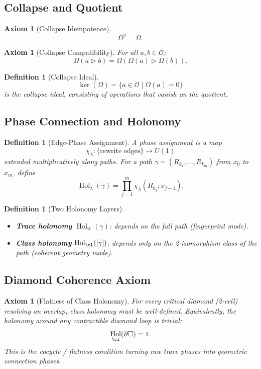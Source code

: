 \documentclass[12pt, oneside]{article}
\newtheorem{definition}[theorem]{Definition}
\newtheorem{axiom}[theorem]{Axiom}
\DeclareMathOperator{\tr}{tr}
\DeclareMathOperator{\Hol}{Hol}
\begin{document}
\subsection{Collapse and Quotient}

\begin{axiom}[Collapse Idempotence]
\[
\Omega^2 = \Omega.
\]
\end{axiom}

\begin{axiom}[Collapse Compatibility]
For all $a,b \in \mathcal{O}$:
\[
\Omega(a \triangleright b) = \Omega(\Omega(a) \triangleright \Omega(b)).
\]
\end{axiom}

\begin{definition}[Collapse Ideal]
\[
\ker(\Omega) = \{ a \in \mathcal{O} \mid \Omega(a) = 0 \}
\]
is the collapse ideal, consisting of operations that vanish on the quotient.
\end{definition}

\subsection{Phase Connection and Holonomy}

\begin{definition}[Edge-Phase Assignment]
A phase assignment is a map
\[
\chi_\lambda: \{\text{rewrite edges}\} \to U(1)
\]
extended multiplicatively along paths. For a path $\gamma = (R_{k_1}, \dots, R_{k_m})$ from $x_0$ to $x_m$, define
\[
\Hol_{\lambda}(\gamma) = \prod_{j=1}^m \chi_\lambda(R_{k_j}; x_{j-1}).
\]
\end{definition}

\begin{definition}[Two Holonomy Layers]
\begin{itemize}
    \item \textbf{Trace holonomy} \( \Hol_{\tr}(\gamma) \): depends on the full path (fingerprint mode).
    \item \textbf{Class holonomy} \( \Hol_{\cl}([\gamma]) \): depends only on the 2-isomorphism class of the path (coherent geometry mode).
\end{itemize}
\end{definition}

\subsection{Diamond Coherence Axiom}

\begin{axiom}[Flatness of Class Holonomy]
For every critical diamond (2-cell) resolving an overlap, class holonomy must be well-defined. Equivalently, the holonomy around any contractible diamond loop is trivial:
\[
\Hol_{\cl}(\partial \square) = 1.
\]
This is the cocycle / flatness condition turning raw trace phases into geometric connection phases.
\end{axiom}
\end{document}
